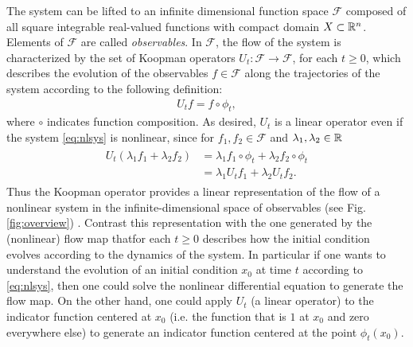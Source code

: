 The system can be lifted to an infinite dimensional function space $\mathcal{F}$ composed of all square integrable real-valued functions with compact domain $X \subset \mathbb{R}^n$.
Elements of $\mathcal{F}$ are called \emph{observables}.
In $\mathcal{F}$, the flow of the system is characterized by the set %
of Koopman operators 
$U_t : \mathcal{F} \to \mathcal{F}$, for each $t \geq 0$,
which describes the evolution of the observables ${f \in \mathcal{F}}$ along the trajectories of the system according to the following definition:
\begin{align}
    U_t f = f \circ \phi_t,      
    \label{eq:koopman}
\end{align}
where $\circ$ indicates function composition.
As desired, $U_t$ is a linear operator even if the system \eqref{eq:nlsys} is nonlinear, since for $f_1, f_2 \in \mathcal{F}$ and $\lambda_1, \lambda_2 \in \mathbb{R}$
\begin{align}
    \begin{split}
    U_t (\lambda_1 f_1 + \lambda_2 f_2) &= \lambda_1 f_1 \circ \phi_t + \lambda_2 f_2 \circ \phi_t \\
    &= \lambda_1 U_t f_1 + \lambda_2 U_t f_2.
    \end{split}
\end{align}
Thus the Koopman operator provides a linear representation of the flow of a nonlinear system in the infinite-dimensional space of observables (see Fig. \ref{fig:overview}) \cite{budivsic2012applied}.
Contrast this representation with the one generated by the (nonlinear) flow map thatfor each $t \geq 0$ describes how the initial condition evolves according to the dynamics of the system.
In particular if one wants to understand the evolution of an initial condition $x_0$ at time $t$ according to \eqref{eq:nlsys}, then one could solve the nonlinear differential equation to generate the flow map. 
On the other hand, one could apply $U_t$ (a linear operator) to the indicator function centered at $x_0$ (i.e. the function that is $1$ at $x_0$ and zero everywhere else) to generate an indicator function centered at the point $\phi_t(x_0)$.


